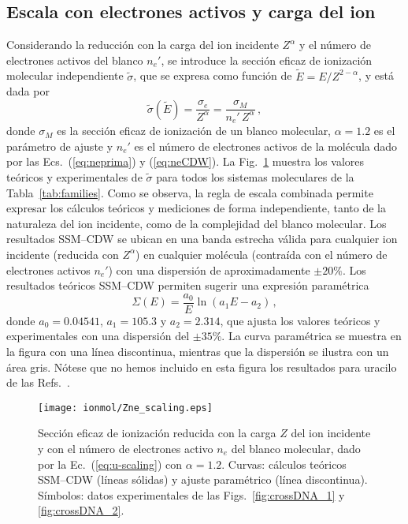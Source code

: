 \subsection{Escala con electrones activos y carga del ion}
\label{sec:nez_scaling}

Considerando la reducción con la carga del ion incidente $Z^\alpha$ y  
el número de electrones activos del blanco $n_e'$, se introduce la 
sección eficaz de ionización molecular independiente $\tilde{\sigma}$, 
que se expresa como función de $\tilde{E}=E/Z^{2-\alpha}$, y está dada 
por 
\begin{equation}
\tilde{\sigma}\left(\tilde{E}\right)=\frac{\sigma_e}{Z^{\alpha}}
=\frac{\sigma_M}{n_e'\,Z^{\alpha}}\,,
\label{eq:u-scaling}
\end{equation}
donde $\sigma_M$ es la sección eficaz de ionización de un blanco 
molecular, $\alpha=1.2$ es el parámetro de ajuste y $n_e'$ es el número 
de electrones activos de la molécula dado por las 
Ecs.~(\ref{eq:neprima}) y (\ref{eq:neCDW}). La Fig.~\ref{fig:zalpha} 
muestra los valores teóricos y experimentales de $\tilde{\sigma}$ para 
todos los sistemas moleculares de la Tabla~\ref{tab:families}. Como se 
observa, la regla de escala combinada permite expresar los cálculos 
teóricos y mediciones de forma independiente, tanto de la naturaleza del 
ion incidente, como de la complejidad del blanco molecular. Los 
resultados SSM--CDW se ubican en una banda estrecha válida para 
cualquier ion incidente (reducida con $Z^\alpha$) en cualquier 
molécula (contraída con el número de electrones activos $n_e'$) con una 
dispersión de aproximadamente $\pm 20\%$. Los resultados teóricos 
SSM--CDW permiten sugerir una expresión paramétrica
\begin{equation}
\Sigma(E)= \frac{a_0}{E} \ln \left( a_1 E - a_2 \right)\,,
\end{equation}
donde $a_0=0.04541$, $a_1=105.3$ y $a_2=2.314$, que ajusta los valores 
teóricos y experimentales con una dispersión del $\pm 35\%$. La curva 
paramétrica se muestra en la figura con una línea discontinua, mientras 
que la dispersión se ilustra con un área gris. Nótese que no hemos 
incluido en esta figura los resultados para uracilo de las 
Refs.~\cite{agnihotri2012,agnihotri2013}. 

\begin{figure}[t]
\centering
\texttt{[image: ionmol/Zne\_scaling.eps]}
\caption[Sección eficaz de ionización reducida por $Z$ y $n_e$.]
{Sección eficaz de ionización reducida con la carga $Z$ del ion 
incidente y con el número de electrones activo $n_e$ del blanco 
molecular, dado por la Ec.~(\ref{eq:u-scaling}) con $\alpha=1.2$. 
Curvas: cálculos teóricos SSM--CDW (líneas sólidas) y ajuste paramétrico 
(línea discontinua). Símbolos: datos experimentales de las 
Figs.~\ref{fig:crossDNA_1} y \ref{fig:crossDNA_2}.}
\label{fig:zalpha}
\end{figure} 

